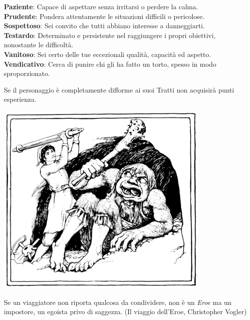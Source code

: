 \begin{multicols}{2}
{\textbf{Paziente}: Capace di aspettare senza irritarsi o perdere la calma.\\
\textbf{Prudente}: Pondera attentamente le situazioni difficili o pericolose.\\
\textbf{Sospettoso}: Sei convito che tutti abbiano interesse a danneggiarti.\\
\textbf{Testardo}: Determinato e persistente nel raggiungere i propri obiettivi, nonostante le difficoltà.\\
\textbf{Vanitoso}: Sei certo delle tue eccezionali qualità, capacità ed aspetto.\\
\textbf{Vendicativo}: Cerca di punire chi gli ha fatto un torto, spesso in modo sproporzionato.

}
\end{multicols}


\smallskip

Se il personaggio è completamente difforme ai suoi Tratti non acquisirà punti esperienza.

\vfill

\begin{center}
\includegraphics[height=0.4\linewidth]{immagini/troll.png}
\end{center}

\medskip

\begin{changemargin}{0.3cm}{0.3cm}\begin{enfasi}{Se un viaggiatore non riporta qualcosa da condividere, non è un \emph{Eroe} ma un impostore, un egoista privo di saggezza. (Il viaggio dell'Eroe, Christopher Vogler)}\end{enfasi}\end{changemargin}

\pagebreak

